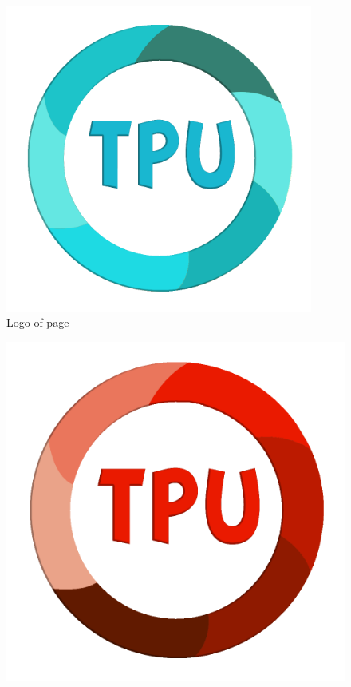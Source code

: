 \documentclass[twocolumn]{article}
\begin{document}
	\begin{figure}[!h] %
		\centering %
		\caption{\label{experiment}Logo of page} %
		\includegraphics[width=0.9\textwidth]{images/Blue.png} %
	\end{figure}

	\begin{figure}
	\includegraphics[width=0.9\columnwidth]{images/Red.png} %
	\end{figure}
\end{document}

